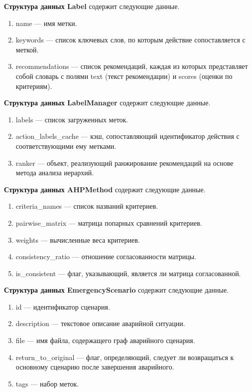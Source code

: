 \textbf{Структура данных Label} содержит следующие данные.
\begin{enumerate}
    \item name --- имя метки.
    \item keywords --- список ключевых слов, по которым действие сопоставляется с меткой.
    \item recommendations --- список рекомендаций, каждая из которых представляет собой словарь с полями text (текст рекомендации) и scores (оценки по критериям).
\end{enumerate}

\textbf{Структура данных LabelManager} содержит следующие данные.
\begin{enumerate}
    \item labels --- список загруженных меток.
    \item action\_labels\_cache --- кэш, сопоставляющий идентификатор действия с соответствующими ему метками.
    \item ranker --- объект, реализующий ранжирование рекомендаций на основе метода анализа иерархий.
\end{enumerate}

\textbf{Структура данных AHPMethod} содержит следующие данные.
\begin{enumerate}
    \item criteria\_names --- список названий критериев.
    \item pairwise\_matrix --- матрица попарных сравнений критериев.
    \item weights --- вычисленные веса критериев.
    \item consistency\_ratio --- отношение согласованности матрицы.
    \item is\_consistent --- флаг, указывающий, является ли матрица согласованной.
\end{enumerate}

\textbf{Структура данных EmergencyScenario} содержит следующие данные.
\begin{enumerate}
    \item id --- идентификатор сценария.
    \item description --- текстовое описание аварийной ситуации.
    \item file --- имя файла, содержащего граф аварийного сценария.
    \item return\_to\_original --- флаг, определяющий, следует ли возвращаться к основному сценарию после завершения аварийного.
    \item tags --- набор меток.
\end{enumerate}

